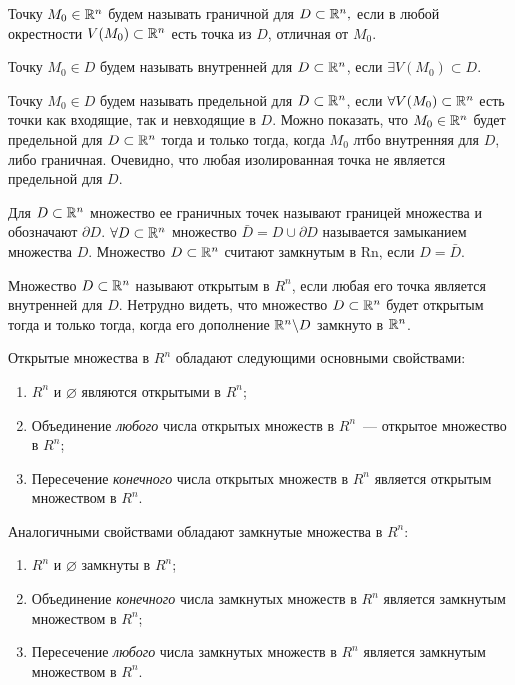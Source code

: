 \documentclass[../main.tex]{subfiles}
\begin{document}
	Точку $M_0 \in \mathbb{R}^n$ будем называть граничной для $D \subset \mathbb{R}^n,$ если в любой окрестности $V(M_0) \subset \mathbb{R}^n$ есть точка из $D$, отличная от $M_0$. 
	
	Точку $M_0 \in D$ будем называть внутренней для $D \subset \mathbb{R}^n$, если $\exists V(M_0) \subset D$.
	
	Точку $M_0 \in D$ будем называть предельной для $D \subset \mathbb{R}^n$, если $\forall V(M_0) \subset \mathbb{R}^n$ есть точки как входящие, так и невходящие в $D$.
	Можно показать, что $M_0 \in \mathbb{R}^n$ будет предельной для $D \subset \mathbb{R}^n$ тогда и только тогда, когда $M_0$ лтбо внутренняя для $D$, либо граничная.
	Очевидно, что любая изолированная точка не является предельной для $D$.
	
	Для $D \subset \mathbb{R}^n$ множество ее граничных точек называют границей множества  и обозначают $\partial D$. 
	$\forall D \subset \mathbb{R}^n$ множество $\bar D = D \cup \partial D$ называется замыканием множества $D$. 
	Множество $D \subset \mathbb{R}^n$ считают замкнутым в Rn, если  $D = \bar D$.
	
	Множество $D \subset \mathbb{R}^n$ называют открытым в $R^n$, если любая его точка является внутренней для $D$. Нетрудно видеть, что множество $D \subset \mathbb{R}^n$ будет открытым тогда и только тогда, когда его дополнение $\mathbb{R}^n \backslash D$ замкнуто в $\mathbb{R}^n$. 
	
	\smallskip
	Открытые множества в $R^n$ обладают следующими основными свойствами:
	\begin{enumerate}
		\item
	 	$R^n$  и $\varnothing$ являются открытыми в $R^n$; 
	 	\item
	 	 Объединение \emph{любого} числа открытых множеств в $R^n$~--- открытое множество в $R^n$; 
	 	 \item Пересечение \emph{конечного} числа открытых множеств в $R^n$ является открытым множеством в $R^n$.
	\end{enumerate}	

	Аналогичными свойствами обладают замкнутые множества в $R^n$:
	\begin{enumerate}
		\item  $R^n$  и $\varnothing$ замкнуты в $R^n$;
		\item Объединение \emph{конечного}  числа замкнутых множеств в $R^n$ является замкнутым множеством в $R^n$; 
		\item Пересечение \emph{любого} числа замкнутых множеств в $R^n$ является замкнутым множеством в $R^n$.
	\end{enumerate} 
	
\end{document}
